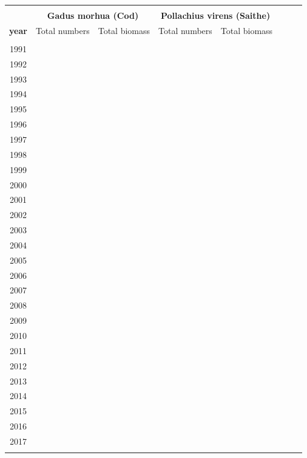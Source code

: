 \documentclass[a4paper 12pt]{article}
\numberwithin{equation}{section}
\begin{document}
\begin{table}[h!]
\centering
{}
\begin{tabular}{cccccccc}
\hline \\[0.1ex]
  & \multicolumn{2}{c}{\bf Gadus morhua (Cod)} & \multicolumn{2}{c}{\bf Pollachius virens (Saithe)}\\[1.5ex]
{\bf year }  & Total numbers & Total biomass   & Total numbers & Total biomass   \\[0.5ex]
\hline \\[0.5ex]
1991  &  &    &   &  \\[1ex]
1992  &  &    &   &   \\[1ex]
1993  &  &    &   &   \\[1ex]
1994  &  &    &   &   \\[1ex]
1995  &  &    &   &    \\[1ex]
1996  &  &    &   &   \\[1ex]
1997  &  &    &   &   \\[1ex]
1998  &  &    &   &    \\[1ex]
1999  &  &    &   &    \\[1ex]
2000  &  &    &   &    \\[1ex]
2001  &  &    &   &  \\[1ex]
2002  &  &    &   &      \\[1ex]
2003  &  &    &   &   \\[1ex]
2004  &  &    &   &    \\[1ex]
2005  &  &    &   &   \\[1ex]
2006  &  &    &   &   \\[1ex]

2007  &  &    &   &    \\[1ex]
2008  &  &    &   &  \\[1ex]
2009  &  &    &   &      \\[1ex]
2010  &  &    &   &    \\[1ex]
2011  &  &    &   &    \\[1ex]
2012  &  &    &   &   \\[1ex]
2013  &  &    &   &   \\[0.5ex]

2014  &  &    &   &    \\[1ex]
2015  &  &    &   &    \\[1ex]
2016  &  &    &   &   \\[1ex]
2017  &  &    &   &    \\[0.5ex]
\hline\\
\end{tabular}
\end{table}
\end{document}
